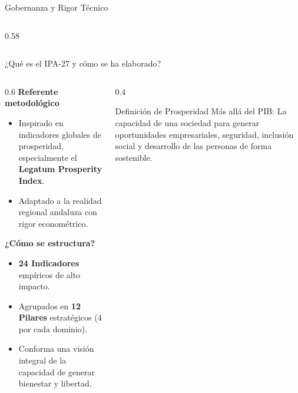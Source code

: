 \documentclass[10pt, aspectratio=169]{beamer}
\begin{document}
\begin{frame}{Gobernanza y Rigor Técnico}
\begin{columns}[T]
\begin{column}{0.58\textwidth}
            \vspace{0.4cm}
        \end{column}
    \end{columns}
\end{frame}

\begin{frame}{\texorpdfstring{¿}{¿}Qué es el IPA-27 y cómo se ha elaborado?}
    \begin{columns}
        \begin{column}{0.6\textwidth}
            \textbf{\textcolor{brandgreen}{Referente metodológico}}
            \begin{itemize}
                \item Inspirado en indicadores globales de prosperidad, especialmente el \textbf{Legatum Prosperity Index}.
                \item Adaptado a la realidad regional andaluza con rigor econométrico.
            \end{itemize}
            \vspace{0.4cm}
            \textbf{\textcolor{brandgreen}{¿Cómo se estructura?}}
            \begin{itemize}
                \item \textbf{24 Indicadores} empíricos de alto impacto.
                \item Agrupados en \textbf{12 Pilares} estratégicos (4 por cada dominio).
                \item Conforma una visión integral de la capacidad de generar bienestar y libertad.
            \end{itemize}
        \end{column}
        \begin{column}{0.4\textwidth}
            \begin{block}{Definición de Prosperidad}
                Más allá del PIB: La capacidad de una sociedad para generar oportunidades empresariales, seguridad, inclusión social y desarrollo de las personas de forma sostenible.
            \end{block}
        \end{column}
    \end{columns}
\end{frame}


\end{document}
